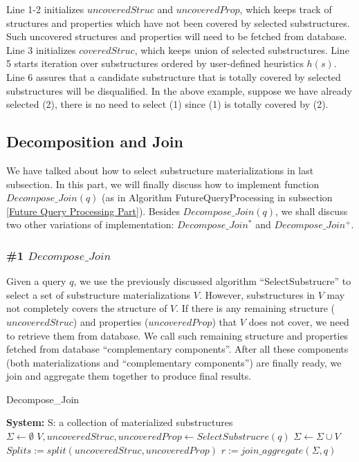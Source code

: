 Line 1-2 initializes $uncoveredStruc$ and $uncoveredProp$, which keeps track of structures and properties which have not been covered by selected substructures. Such uncovered structures and properties will need to be fetched from database. Line 3 initializes $coveredStruc$, which keeps union of selected substructures. Line 5 starts iteration over substructures ordered by user-defined heuristics $h(s)$. Line 6 assures that a candidate substructure that is totally covered by selected substructures will be disqualified. In the above example, suppose we have already selected (2), there is no need to select (1) since (1) is totally covered by (2).

\subsection{Decomposition and Join}
\label{Query Decomposition}
We have talked about how to select substructure materializations in last subsection. In this part, we will finally discuss how to implement function $Decompose\_Join(q)$ (as in Algorithm FutureQueryProcessing in subsection \ref{Future Query Processing Part}). Besides $Decompose\_Join(q)$, we shall discuss two other variations of implementation: $Decompose\_Join^{*}$ and $Decompose\_Join^{+}$.

\subsubsection{\#1 $Decompose\_Join$}
Given a query $q$, we use the previously discussed algorithm ``SelectSubstrucre'' to select a set of substructure materializations $V$. However, substructures in $V$ may not completely covers the structure of $V$. If there is any remaining structure ($uncoveredStruc$) and properties ($uncoveredProp$) that $V$ does not cover, we need to retrieve them from database. We call such remaining structure and properties fetched from database ``complementary  components''. After all these components (both materializations and ``complementary  components'') are finally ready, we join and aggregate them together to produce final results.

\begin{algorithm}[H]
\caption{Decompose\_Join}
\LinesNumbered
\textbf{System:} S: a collection of materialized substructures\\
$\Sigma \gets \emptyset $\;
$V, uncoveredStruc, uncoveredProp \gets SelectSubstrucre(q) $\;
$\Sigma \gets \Sigma \cup V $\;
$Splits:=split(uncoveredStruc, uncoveredProp)$\;
$r := join\_aggregate(\Sigma, q)$\;
\end{algorithm}

